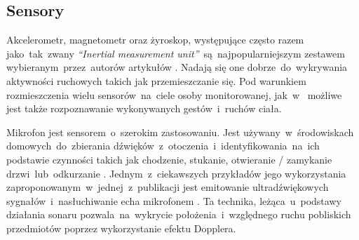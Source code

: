 \subsection{Sensory}
Akcelerometr, magnetometr oraz żyroskop, występujące często razem jako~tak~zwany \textit{``Inertial measurement unit''}~są~najpopularniejszym zestawem wybieranym~przez~autorów artykułów \cite{S30, S32}. Nadają się one dobrze~do~wykrywania aktywności ruchowych takich jak przemieszczanie się. Pod warunkiem rozmieszczenia wielu sensorów~na~ciele osoby monitorowanej, jak~w~\cite{S29} możliwe jest także rozpoznawanie wykonywanych gestów~i~ruchów ciała.

Mikrofon jest sensorem~o~szerokim zastosowaniu. Jest używany~w~środowiskach domowych~do~zbierania dźwięków~z~otoczenia~i~identyfikowania~na~ich podstawie czynności takich jak chodzenie, stukanie, otwieranie / zamykanie drzwi~lub~odkurzanie \cite{S46}. Jednym~z~ciekawszych przykładów jego wykorzystania zaproponowanym~w~jednej~z~publikacji jest emitowanie ultradźwiękowych sygnałów~i~nasłuchiwanie echa mikrofonem \cite{S22}. Ta technika, leżąca~u~podstawy działania sonaru pozwala~na~wykrycie położenia~i~względnego ruchu pobliskich przedmiotów poprzez wykorzystanie efektu Dopplera.

